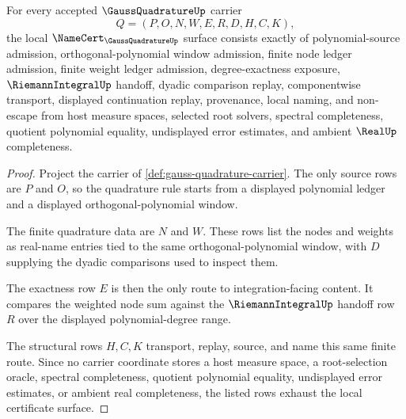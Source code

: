 \begin{theorem}
\label{thm:gauss-quadrature-namecert-obligations}
For every accepted $\GaussQuadratureUp$ carrier
$$
Q=(P,O,N,W,E,R,D,H,C,K),
$$
the local $\NameCert_{\GaussQuadratureUp}$ surface consists exactly of polynomial-source admission, orthogonal-polynomial window admission, finite node ledger admission, finite weight ledger admission, degree-exactness exposure, $\RiemannIntegralUp$ handoff, dyadic comparison replay, componentwise transport, displayed continuation replay, provenance, local naming, and non-escape from host measure spaces, selected root solvers, spectral completeness, quotient polynomial equality, undisplayed error estimates, and ambient $\RealUp$ completeness.
\end{theorem}
\begin{proof}
Project the carrier of \autoref{def:gauss-quadrature-carrier}. The only source rows are $P$ and $O$, so the quadrature rule starts from a displayed polynomial ledger and a displayed orthogonal-polynomial window.

The finite quadrature data are $N$ and $W$. These rows list the nodes and weights as real-name entries tied to the same orthogonal-polynomial window, with $D$ supplying the dyadic comparisons used to inspect them.

The exactness row $E$ is then the only route to integration-facing content. It compares the weighted node sum against the $\RiemannIntegralUp$ handoff row $R$ over the displayed polynomial-degree range.

The structural rows $H,C,K$ transport, replay, source, and name this same finite route. Since no carrier coordinate stores a host measure space, a root-selection oracle, spectral completeness, quotient polynomial equality, undisplayed error estimates, or ambient real completeness, the listed rows exhaust the local certificate surface.
\end{proof}

